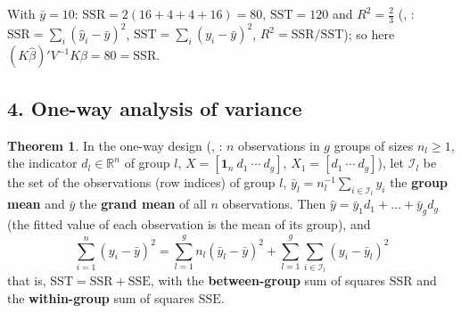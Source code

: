 \documentclass[12pt]{article}
\newcommand{\R}{\mathbb R}
\newcommand{\one}{\mathbf 1}
\theoremstyle{definition}
\newtheorem{theorem}{Theorem}
\begin{document}
With \(\bar y=10\): \(\mathrm{SSR}=2(16+4+4+16)=80\), \(\mathrm{SST}=120\) and \(R^2=\frac23\) (, :
\(\mathrm{SSR}=\sum_i(\hat y_i-\bar y)^2\), \(\mathrm{SST}=\sum_i(y_i-\bar y)^2\), \(R^2=\mathrm{SSR}/\mathrm{SST}\)); so
here \((K\hat\beta)'V^{-1}K\hat\beta=80=\mathrm{SSR}\).

\subsection*{4. One-way analysis of variance}

\begin{theorem}\label{h-thm-oneway-anova}
In the one-way design (, : \(n\) observations in \(g\) groups of sizes \(n_l\geqslant1\), the
indicator \(d_l\in\R^n\) of group \(l\), \(X=[\one_n\ d_1\ \cdots\ d_g]\), \(X_1=[d_1\ \cdots\ d_g]\)), let
\(\mathcal I_l\) be the set of the observations (row indices) of group \(l\), \(\bar y_l=n_l^{-1}\sum_{i\in\mathcal
I_l}y_i\) the \textbf{group mean} and \(\bar y\) the \textbf{grand mean} of all \(n\) observations. Then
\(\hat y=\bar y_1d_1+\dots+\bar y_gd_g\) (the fitted value of each observation is the mean of its group), and
\[
\sum_{i=1}^n(y_i-\bar y)^2=\sum_{l=1}^gn_l(\bar y_l-\bar y)^2+\sum_{l=1}^g\sum_{i\in\mathcal I_l}(y_i-\bar y_l)^2
\]
that is, \(\mathrm{SST}=\mathrm{SSR}+\mathrm{SSE}\), with the \textbf{between-group} sum of squares \(\mathrm{SSR}\) and the
\textbf{within-group} sum of squares \(\mathrm{SSE}\).
\end{theorem}
\end{document}
